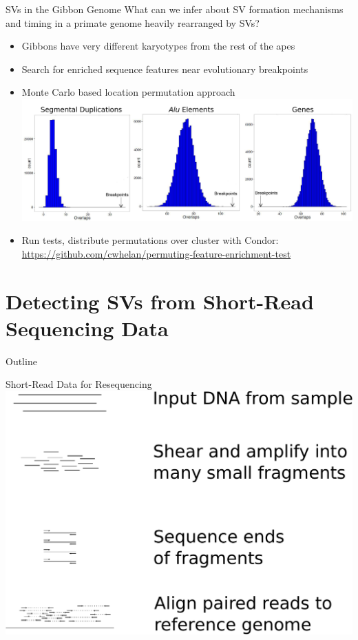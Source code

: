 \documentclass{beamer}
\begin{document}
\begin{frame}{SVs in the Gibbon Genome}
What can we infer about SV formation mechanisms and timing in a primate genome heavily rearranged by SVs?
\begin{itemize}
  \item Gibbons have very different karyotypes from the rest of the apes
  \item Search for enriched sequence features near evolutionary breakpoints
  \item Monte Carlo based location permutation approach
     \includegraphics[width=.75\textwidth]{gibbon_genome_histograms.pdf}
  \item Run tests, distribute permutations over cluster with Condor: \\
  \small  \url{https://github.com/cwhelan/permuting-feature-enrichment-test}
\end{itemize}
\end{frame}

\section{Detecting SVs from Short-Read Sequencing Data}
\begin{frame}{Outline}
  \tableofcontents[currentsection]
\end{frame}

\begin{frame}{Short-Read Data for Resequencing}
\center
\includegraphics[width=.75\textwidth]{short_read_sequencing.pdf}
\end{frame}
\end{document}

